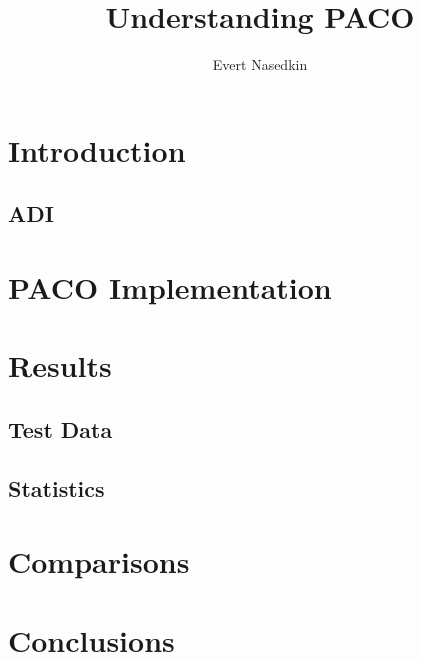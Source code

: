 \documentclass[]{article}
\title{Understanding PACO}
\author{Evert Nasedkin}
\begin{document}
\maketitle

\begin{abstract}

\end{abstract}

\section{Introduction}
\subsection{ADI}
\section{PACO Implementation}
\section{Results}
\subsection{Test Data}
\subsection{Statistics}
\section{Comparisons}
\section{Conclusions}
\end{document}
